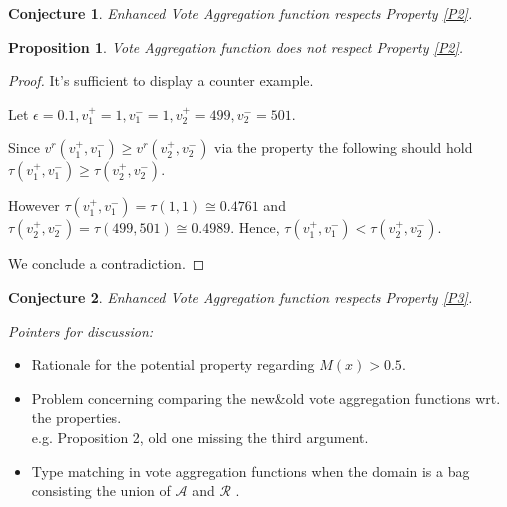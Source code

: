 \documentclass{article}
\newtheorem{proposition}{Proposition}
\newtheorem{conjecture}{Conjecture}
\newcommand{\args}{\mathcal{A}} %
\newcommand{\att}{\mathcal{R}}  %
\begin{document}
\begin{conjecture}
Enhanced Vote Aggregation function respects Property \ref{P2}.
\end{conjecture}

\begin{proposition}
Vote Aggregation function\cite{eml2013esaf} does not respect Property \ref{P2}.
\end{proposition}

\begin{proof}
It's sufficient to display a counter example.

Let $\epsilon = 0.1, v_1^{+} = 1, v_1^{-} = 1, v_2^{+} = 499, v_2^{-} = 501$.

Since $v^{r}(v_1^{+}, v_1^{-}) \ge v^{r}(v_2^{+}, v_2^{-})$ via the property the following should hold $\tau(v_1^{+}, v_1^{-}) \ge \tau(v_2^{+}, v_2^{-})$.

However $\tau(v_1^{+}, v_1^{-}) = \tau(1, 1) \cong 0.4761$ and  $\tau(v_2^{+}, v_2^{-}) = \tau(499, 501) \cong 0.4989$.
Hence, $\tau(v_1^{+}, v_1^{-}) < \tau(v_2^{+}, v_2^{-})$.

We conclude a contradiction.
\end{proof}

\begin{conjecture}
Enhanced Vote Aggregation function respects Property \ref{P3}.
\end{conjecture}




{\color{teal}
 
\emph{Pointers for discussion:} 
\begin{itemize}
\item Rationale for the potential property regarding $M(x) > 0.5$.
\item Problem concerning comparing the new\&old vote aggregation functions wrt. the properties. \\ e.g. Proposition 2, old one missing the third argument.
\item Type matching in vote aggregation functions when the domain is a bag consisting the union of $\args$ and $\att$ .
\end{itemize}
}
\end{document}
